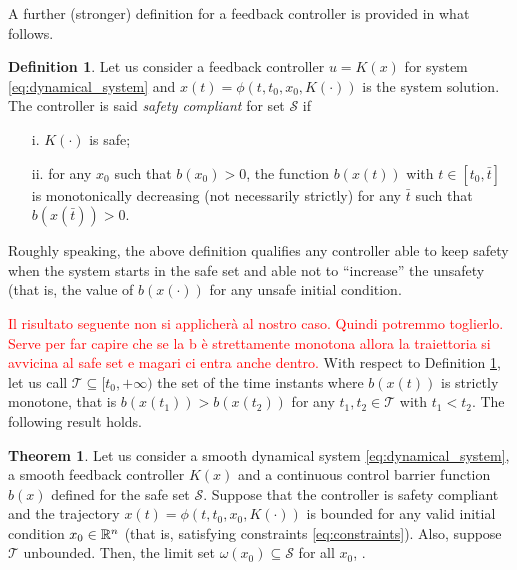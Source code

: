 \documentclass[letterpaper, 10 pt, conference]{ieeeconf}
\newcounter{Definition}
\theoremstyle{definition}
\theoremstyle{nopoint}
\newtheorem{definitionNoPoint}{Definition}
\newtheorem{theorem}{Theorem}[section]
\newcounter{Theorem}
\begin{document}
A further (stronger) definition for a feedback controller is provided in what follows.


\begin{definitionNoPoint}\label{def:safety_compliant}
Let us consider a feedback controller $u=K(x)$ for system  \eqref{eq:dynamical_system} and $x(t)=\phi(t,t_0,x_0,K(\cdot))$ is the system solution. 
The controller is said {\em safety compliant} for set $\mathcal{S}$ if
\begin{itemize}
\item [i.]  $K(\cdot)$ is safe;
\item [ii.] for any $x_0$ such that $b(x_0)>0 $, the function $b(x(t))$ with $t\in [t_0, \bar{t}]$ is monotonically decreasing (not necessarily strictly) for any $\bar{t}$ such that $b(x(\bar{t}))>0$. 
\end{itemize}

\end{definitionNoPoint}

Roughly speaking, the above definition qualifies any controller able to keep safety when the system starts in the safe set and able not to ``increase'' the unsafety (that is, the value of $b(x(\cdot))$ for any unsafe initial condition. 




\textcolor{red}{Il risultato seguente non si applicherà al nostro caso. Quindi potremmo toglierlo. Serve per far capire che se la b è strettamente monotona allora la traiettoria si avvicina al safe set e magari ci entra anche dentro.}
With respect to Definition \ref{def:safety_compliant}, let us call $\mathcal{T}\subseteq [t_0, +\infty) $ the set of the time instants where $b(x(t))$ is strictly monotone, that is $b(x(t_1))>b(x(t_2))$ for any $t_1,t_2\in \mathcal{T}$ with $t_1<t_2$.
The following result holds.

\begin{theorem} \label{thm:safety-compliant}
Let us consider a smooth dynamical system  \eqref{eq:dynamical_system}, a smooth feedback controller $K(x)$ and a continuous control barrier function $b(x)$ defined for the safe set $\mathcal{S}$. 
Suppose that the controller is safety compliant and the trajectory
$x(t)=\phi(t,t_0,x_0,K(\cdot))$ is bounded for any valid initial condition $x_0\in\Bbb{R}^n$ (that is, satisfying constraints \eqref{eq:constraints}). Also, suppose  $\mathcal{T}$ unbounded.
Then, the limit set  $\omega(x_0)\subseteq \mathcal{S}$ for all $x_0$, \cite{khalil}.

\end{theorem}
\end{document}
